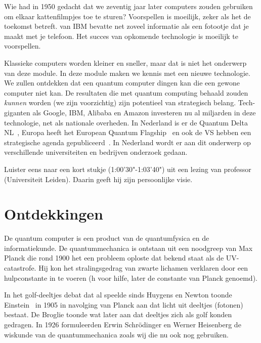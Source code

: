\iffalse%
Wie had in 1950 gedacht dat we zeventig jaar later computers zouden gebruiken om elkaar kattenfilmpjes toe te sturen? Voorspellen is moeilijk, zeker als het de toekomst betreft.  van IBM bevatte net zoveel informatie als een fotootje dat je maakt met je telefoon. Het succes van opkomende technologie is moeilijk te voorspellen.

Klassieke computers worden kleiner en sneller, maar dat is niet het onderwerp van deze module. In deze module maken we kennis met een nieuwe technologie. We zullen ontdekken dat een quantum computer dingen kan die een gewone computer niet kan. De resultaten die met quantum computing behaald zouden \textit{kunnen} worden (we zijn voorzichtig) zijn potentieel van strategisch belang. Tech-giganten als Google, IBM, Alibaba en Amazon investeren nu al miljarden in deze technologie, net als nationale overheden. In Nederland is er de Quantum Delta NL~\cite{qdnl2021}, Europa heeft het European Quantum Flagship~\cite{eqf2017} en ook de VS hebben een strategische agenda gepubliceerd~\cite{usgov2020}. 
In Nederland wordt er aan dit onderwerp op verschillende universiteiten en bedrijven onderzoek gedaan.

Luister eens naar een kort stukje (1:00'30"-1:03'40") uit een lezing van professor   (Universiteit Leiden). Daarin geeft hij zijn persoonlijke visie.


\section{Ontdekkingen}
De quantum computer is een product van de quantumfysica en de informatiekunde. De quantummechanica is ontstaan uit een noodgreep van Max Planck die rond 1900 het een probleem oploste dat bekend staat als de UV-catastrofe. Hij kon het stralingsgedrag van zwarte lichamen verklaren door een hulpconstante in te voeren (h voor hilfe, later de constante van Planck genoemd). 

In het golf-deeltjes debat dat al speelde sinds Huygens en Newton toonde Einstein~\cite{einstein1905photoelectric} in 1905 in navolging van Planck aan dat licht uit deeltjes (fotonen) bestaat. De Broglie toonde wat later aan dat deeltjes zich als golf konden gedragen. In 1926 formuleerden Erwin Schr\"odinger en Werner Heisenberg de wiskunde van de quantummechanica zoals wij die nu ook nog gebruiken.

